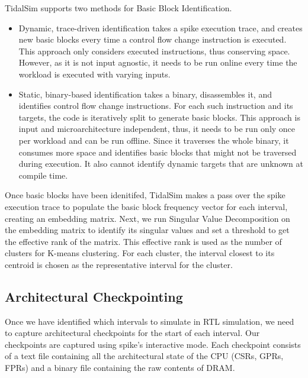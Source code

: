 \documentclass[sigplan,nonacm,10pt]{acmart}
\begin{document}

TidalSim supports two methods for Basic Block Identification.
\begin{itemize}
  \item Dynamic, trace-driven identification takes a spike execution trace, and creates new basic blocks every time a control flow change instruction is executed.
  This approach only considers executed instructions, thus conserving space. However, as it is not input agnostic, it needs to be run online every time the workload is executed with varying inputs.
  \item Static, binary-based identification takes a binary, disassembles it, and identifies control flow change instructions. For each such instruction and its targets, the code is iteratively split to generate basic blocks.
  This approach is input and microarchitecture independent, thus, it needs to be run only once per workload and can be run offline. Since it traverses the whole binary, it consumes more space and identifies basic blocks that might not be traversed during execution. It also cannot identify dynamic targets that are unknown at compile time.
\end{itemize}

Once basic blocks have been idenitifed, TidalSim makes a pass over the spike execution trace to populate the basic block frequency vector for each interval, creating an embedding matrix. Next, we run Singular Value Decomposition on the embedding matrix to identify its singular values and set a threshold to get the effective rank of the matrix. This effective rank is used as the number of clusters for K-means clustering.
For each cluster, the interval closest to its centroid is chosen as the representative interval for the cluster.

\subsection{Architectural Checkpointing}

Once we have identified which intervals to simulate in RTL simulation, we need to capture architectural checkpoints for the start of each interval.
Our checkpoints are captured using spike's interactive mode.
Each checkpoint consists of a text file containing all the architectural state of the CPU (CSRs, GPRs, FPRs) and a binary file containing the raw contents of DRAM.
\end{document}
